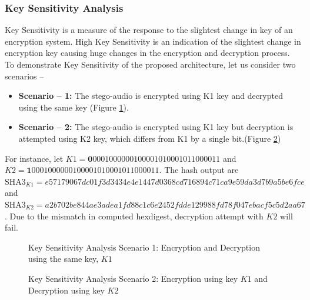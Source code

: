 \documentclass[a4paper]{cas-sc}
\begin{document}
\subsubsection{Key Sensitivity Analysis}
Key Sensitivity is a measure of the response to the slightest change in key of an encryption system. High Key Sensitivity is an indication of the slightest change in encryption key causing huge changes in the encryption and decryption process. To demonstrate Key Sensitivity of the proposed architecture, let us consider two scenarios --
\begin{itemize}
    \item \textbf{Scenario -- 1:} The stego-audio is encrypted using K1 key and decrypted using the same key (Figure \ref{fig:keySensitivityK1}).
    \item \textbf{Scenario -- 2:} The stego-audio is encrypted using K1 key but decryption is attempted using K2 key, which differs from K1 by a single bit.(Figure \ref{fig:keySensitivityK2})
\end{itemize}
For instance, let $K1=\mathbf{0}0001000000100001010001011000011$ and $K2=\mathbf{1}0001000000100001010001011000011$. The hash output are $\text{SHA3}_{K1}=e57179067dc01f3d3434e4e1447d0368cd716894c71ca9e59da3d7b9a5be6fce$ and $\text{SHA3}_{K2}=a2b702be844ae3adea1fd88c1c6e2452fdde129988fd78f047ebacf5c5d2aa67$. Due to the mismatch in computed hexdigest, decryption attempt with $K2$ will fail.
\begin{figure}[pos=h]
    \begin{center}
        
        \caption{Key Sensitivity Analysis Scenario 1: Encryption and Decryption using the same key, $K1$}
        \label{fig:keySensitivityK1}
    \end{center}
\end{figure}
\begin{figure}[pos=h]
    \begin{center}
        
        \caption{Key Sensitivity Analysis Scenario 2: Encryption using key $K1$ and Decryption using key $K2$}
        \label{fig:keySensitivityK2}
    \end{center}
\end{figure}
\end{document}
